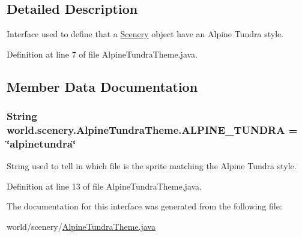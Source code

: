 \subsection{Detailed Description}
Interface used to define that a \hyperlink{a00024}{Scenery} object have an Alpine Tundra style. 

Definition at line 7 of file Alpine\-Tundra\-Theme.\-java.



\subsection{Member Data Documentation}
\hypertarget{a00002_ad3c9b18e312ff348661fc1a42f28f7b6}{
\subsubsection[{A\-L\-P\-I\-N\-E\-\_\-\-T\-U\-N\-D\-R\-A}]{\setlength{\rightskip}{0pt plus 5cm}String world.\-scenery.\-Alpine\-Tundra\-Theme.\-A\-L\-P\-I\-N\-E\-\_\-\-T\-U\-N\-D\-R\-A = \char`\"{}alpinetundra\char`\"{}\hspace{0.3cm}{\ttfamily [static]}}}\label{a00002_ad3c9b18e312ff348661fc1a42f28f7b6}


String used to tell in which file is the sprite matching the Alpine Tundra style. 



Definition at line 13 of file Alpine\-Tundra\-Theme.\-java.



The documentation for this interface was generated from the following file\-:\begin{DoxyCompactItemize}
\item 
world/scenery/\hyperlink{a00062}{Alpine\-Tundra\-Theme.\-java}\end{DoxyCompactItemize}
